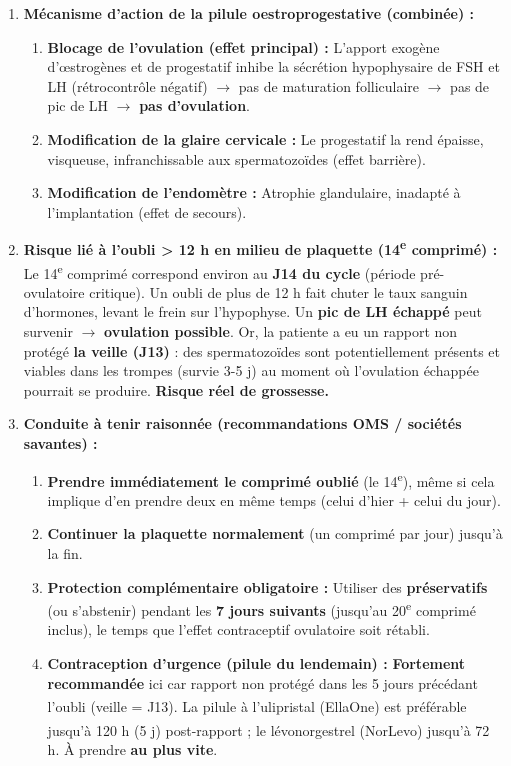 \documentclass[11pt]{article}
\begin{document}
\begin{corrige}
\begin{enumerate}
\item \textbf{Mécanisme d'action de la pilule oestroprogestative (combinée) :}
\begin{enumerate}
\item \textbf{Blocage de l'ovulation (effet principal) :} L'apport exogène d'œstrogènes et de progestatif inhibe la sécrétion hypophysaire de FSH et LH (rétrocontrôle négatif) $\rightarrow$ pas de maturation folliculaire $\rightarrow$ pas de pic de LH $\rightarrow$ \textbf{pas d'ovulation}.
\item \textbf{Modification de la glaire cervicale :} Le progestatif la rend épaisse, visqueuse, infranchissable aux spermatozoïdes (effet barrière).
\item \textbf{Modification de l'endomètre :} Atrophie glandulaire, inadapté à l'implantation (effet de secours).
\end{enumerate}
\item \textbf{Risque lié à l'oubli > 12 h en milieu de plaquette (14\textsuperscript{e} comprimé) :}
Le 14\textsuperscript{e} comprimé correspond environ au \textbf{J14 du cycle} (période pré-ovulatoire critique). Un oubli de plus de 12 h fait chuter le taux sanguin d'hormones, levant le frein sur l'hypophyse. Un \textbf{pic de LH échappé} peut survenir $\rightarrow$ \textbf{ovulation possible}. Or, la patiente a eu un rapport non protégé \textbf{la veille (J13)} : des spermatozoïdes sont potentiellement présents et viables dans les trompes (survie 3-5 j) au moment où l'ovulation échappée pourrait se produire. \textbf{Risque réel de grossesse.}
\item \textbf{Conduite à tenir raisonnée (recommandations OMS / sociétés savantes) :}
\begin{enumerate}
\item \textbf{Prendre immédiatement le comprimé oublié} (le 14\textsuperscript{e}), même si cela implique d'en prendre deux en même temps (celui d'hier + celui du jour).
\item \textbf{Continuer la plaquette normalement} (un comprimé par jour) jusqu'à la fin.
\item \textbf{Protection complémentaire obligatoire :} Utiliser des \textbf{préservatifs} (ou s'abstenir) pendant les \textbf{7 jours suivants} (jusqu'au 20\textsuperscript{e} comprimé inclus), le temps que l'effet contraceptif ovulatoire soit rétabli.
\item \textbf{Contraception d'urgence (pilule du lendemain) :} \textbf{Fortement recommandée} ici car rapport non protégé dans les 5 jours précédant l'oubli (veille = J13). La pilule à l'ulipristal (EllaOne\textsuperscript{\textregistered}) est préférable jusqu'à 120 h (5 j) post-rapport ; le lévonorgestrel (NorLevo\textsuperscript{\textregistered}) jusqu'à 72 h. À prendre \textbf{au plus vite}.

\end{enumerate}
\end{enumerate}
\end{corrige}
\end{document}
